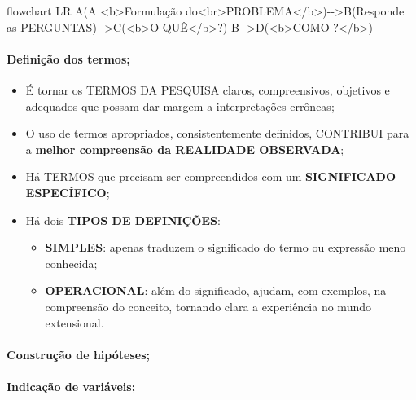 \documentclass[
]{book}
\newenvironment{Shaded}{\begin{snugshade}}{\end{snugshade}}
\newcommand{\NormalTok}[1]{#1}
\providecommand{\tightlist}{%
  \setlength{\itemsep}{0pt}\setlength{\parskip}{0pt}}
\begin{document}
\begin{Shaded}
\begin{Highlighting}[]
\NormalTok{flowchart LR}
\NormalTok{A(A \textless{}b\textgreater{}Formulação do\textless{}br\textgreater{}PROBLEMA\textless{}/b\textgreater{}){-}{-}\textgreater{}B(Responde as PERGUNTAS){-}{-}\textgreater{}C(\textless{}b\textgreater{}O QUÊ\textless{}/b\textgreater{}?)}
\NormalTok{B{-}{-}\textgreater{}D(\textless{}b\textgreater{}COMO ?\textless{}/b\textgreater{})}
\end{Highlighting}
\end{Shaded}

\hypertarget{definiuxe7uxe3o-dos-termos}{%
\paragraph{Definição dos termos;}\label{definiuxe7uxe3o-dos-termos}}

\begin{itemize}
\tightlist
\item
  É tornar os TERMOS DA PESQUISA claros, compreensivos, objetivos e
  adequados que possam dar margem a interpretações errôneas;
\item
  O uso de termos apropriados, consistentemente definidos, CONTRIBUI
  para a \textbf{melhor compreensão da REALIDADE OBSERVADA};
\item
  Há TERMOS que precisam ser compreendidos com um \textbf{SIGNIFICADO
  ESPECÍFICO};
\item
  Há dois \textbf{TIPOS DE DEFINIÇÕES}:

  \begin{itemize}
  \tightlist
  \item
    \textbf{SIMPLES}: apenas traduzem o significado do termo ou
    expressão meno conhecida;
  \item
    \textbf{OPERACIONAL}: além do significado, ajudam, com exemplos, na
    compreensão do conceito, tornando clara a experiência no mundo
    extensional.
  \end{itemize}
\end{itemize}

\hypertarget{construuxe7uxe3o-de-hipuxf3teses}{%
\paragraph{Construção de
hipóteses;}\label{construuxe7uxe3o-de-hipuxf3teses}}

\hypertarget{indicauxe7uxe3o-de-variuxe1veis}{%
\paragraph{Indicação de
variáveis;}\label{indicauxe7uxe3o-de-variuxe1veis}}
\end{document}
